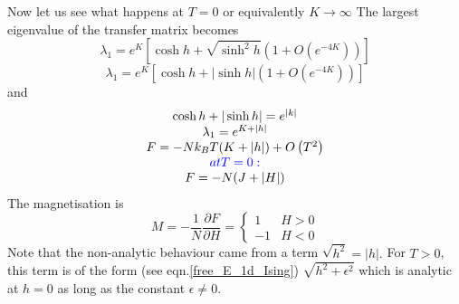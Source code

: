\documentclass[12pt,titlepage]{article}
\numberwithin{equation}{section}
\begin{document}
Now let us see what happens at $T=0$ or equivalently $K \rightarrow \infty$ The largest eigenvalue of the transfer matrix becomes
\begin{equation}
\lambda_{1}=e^{K}\left[\cosh h+\sqrt{\sinh ^{2} h}\left(1+O\left(e^{-4 K}\right)\right)\right]
\end{equation}
\begin{equation}
\lambda_{1}=e^{K}\left[\cosh h+|\sinh h|\left(1+O\left(e^{-4 K}\right)\right)\right]
\end{equation}
and 
\begin{equation}
\begin{array}{c}{\cosh h+|\sinh h|=e^{|k|}} \\ {\lambda_{1}=e^{K+|h|}} \\ {F=-N k_{B} T(K+|h|)+O\left(T^{2}\right)} \\
\textcolor{blue}{at T=0:}\\
{F=-N(J+|H|)}\end{array}
\end{equation}
The magnetisation is
\begin{equation}
M=-\frac{1}{N} \frac{\partial F}{\partial H}=\left\{\begin{array}{rl}{1} & {H>0} \\ {-1} & {H<0}\end{array}\right.
\end{equation}
Note that the non-analytic behaviour came from a term $\sqrt{h^{2}}=|h| .$ For $T>0$, this term is of the form (see eqn.\ref{free_E_1d_Ising}) $\sqrt{h^{2}+\epsilon^{2}}$ which is analytic at $h=0$ as long as the constant $\epsilon \neq 0$.
\end{document}

